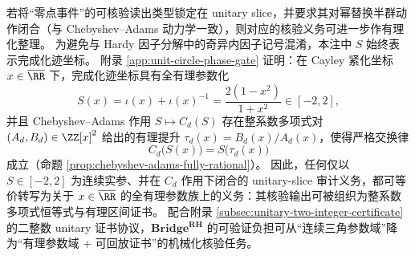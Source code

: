 \begin{remark}\label{rem:bridge-rh-rational-obligationization}
若将“零点事件”的可核验读出类型锁定在 unitary slice，并要求其对幂替换半群动作闭合（与 Chebyshev--Adams 动力学一致），则对应的核验义务可进一步作有理化整理。
为避免与 Hardy 因子分解中的奇异内因子记号混淆，本注中 \(S\) 始终表示完成化迹坐标。
附录 \ref{app:unit-circle-phase-gate} 证明：在 Cayley 紧化坐标 \(x\in\overline{\RR}\) 下，完成化迹坐标具有全有理参数化
\[
S(x)=\iota(x)+\iota(x)^{-1}=\frac{2(1-x^{2})}{1+x^{2}}\in[-2,2],
\]
并且 Chebyshev--Adams 作用 \(S\mapsto C_d(S)\) 存在整系数多项式对 \((A_d,B_d)\in\ZZ[x]^2\) 给出的有理提升 \(\tau_d(x)=B_d(x)/A_d(x)\)，使得严格交换律
\[
C_d\!\bigl(S(x)\bigr)=S\!\bigl(\tau_d(x)\bigr)
\]
成立（命题 \ref{prop:chebyshev-adams-fully-rational}）。
因此，任何仅以 \(S\in[-2,2]\) 为连续实参、并在 \(C_d\) 作用下闭合的 unitary-slice 审计义务，都可等价转写为关于 \(x\in\overline{\RR}\) 的全有理参数族上的义务：其核验输出可被组织为整系数多项式恒等式与有理区间证书。
配合附录 \ref{subsec:unitary-two-integer-certificate} 的二整数 unitary 证书协议，\(\mathbf{Bridge^{RH}}\) 的可验证负担可从“连续三角参数域”降为“有理参数域 + 可回放证书”的机械化核验任务。
\end{remark}

